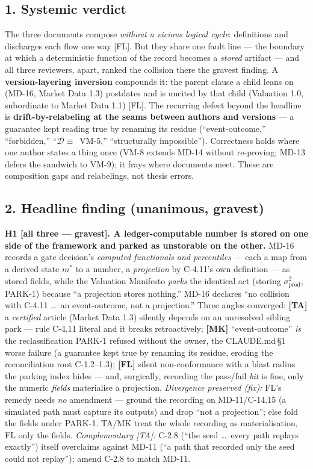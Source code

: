 \documentclass[11pt,a4paper]{article}
\begin{document}
\subsection*{1. Systemic verdict}

The three documents compose \emph{without a vicious logical cycle}: definitions and discharges
each flow one way [FL]. But they share one fault line --- the boundary at which a deterministic
function of the record becomes a \emph{stored} artifact --- and all three reviewers, apart,
ranked the collision there the gravest finding. A \textbf{version-layering inversion} compounds
it: the parent clause a child leans on (MD-16, Market Data 1.3) postdates and is uncited by that
child (Valuation 1.0, subordinate to Market Data 1.1) [FL]. The recurring defect beyond the
headline is \textbf{drift-by-relabeling at the seams between authors and versions} --- a
guarantee kept reading true by renaming its residue (``event-outcome,'' ``forbidden,''
``$\mathcal{D}\equiv$~VM-5,'' ``structurally impossible''). Correctness holds where one author
states a thing once (VM-8 extends MD-14 without re-proving; MD-13 defers the sandwich to VM-9);
it frays where documents meet. These are composition gaps and relabelings, not thesis errors.

\subsection*{2. Headline finding (unanimous, gravest)}

\noindent\textbf{H1 [all three --- gravest]. A ledger-computable number is stored on one side of
the framework and parked as unstorable on the other.} MD-16 records a gate decision's
\emph{computed functionals and percentiles} --- each a map from a derived state $m^\ast$ to a
number, a \emph{projection} by C-4.11's own definition --- as stored fields, while the Valuation
Manifesto \emph{parks} the identical act (storing $\sigma_{\mathrm{prod}}^2$, PARK-1) because ``a
projection stores nothing.'' MD-16 declares ``no collision with C-4.11 \dots\ an event-outcome,
not a projection.'' Three angles converged: \textbf{[TA]} a \emph{certified} article (Market
Data 1.3) silently depends on an unresolved sibling park --- rule C-4.11 literal and it breaks
retroactively; \textbf{[MK]} ``event-outcome'' \emph{is} the reclassification PARK-1 refused
without the owner, the CLAUDE.md\,\S1 worse failure (a guarantee kept true by renaming its
residue, eroding the reconciliation root C-1.2--1.3); \textbf{[FL]} silent non-conformance with
a blast radius the parking index hides --- and, surgically, recording the pass/fail \emph{bit}
is fine, only the numeric \emph{fields} materialise a projection.
\emph{Divergence preserved (fix):} FL's remedy needs \emph{no} amendment --- ground the
recording on MD-11/C-14.15 (a simulated path must capture its outputs) and drop ``not a
projection''; else fold the fields under PARK-1. TA/MK treat the whole recording as
materialisation, FL only the fields. \emph{Complementary [TA]:} C-2.8 (``the seed \dots\ every
path replays exactly'') itself overclaims against MD-11 (``a path that recorded only the seed
could not replay''); amend C-2.8 to match MD-11.
\end{document}
